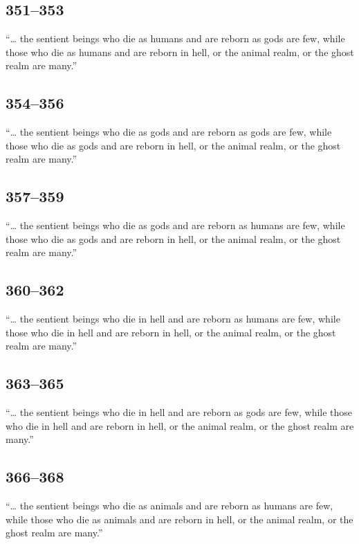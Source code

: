\documentclass[12pt,openany]{book}%
\begin{document}
\subsection*{351–353 }

“… the sentient beings who die as humans and are reborn as gods are few, while those who die as humans and are reborn in hell, or the animal realm, or the ghost realm are many.” 

\subsection*{354–356 }

“… the sentient beings who die as gods and are reborn as gods are few, while those who die as gods and are reborn in hell, or the animal realm, or the ghost realm are many.” 

\subsection*{357–359 }

“… the sentient beings who die as gods and are reborn as humans are few, while those who die as gods and are reborn in hell, or the animal realm, or the ghost realm are many.” 

\subsection*{360–362 }

“… the sentient beings who die in hell and are reborn as humans are few, while those who die in hell and are reborn in hell, or the animal realm, or the ghost realm are many.” 

\subsection*{363–365 }

“… the sentient beings who die in hell and are reborn as gods are few, while those who die in hell and are reborn in hell, or the animal realm, or the ghost realm are many.” 

\subsection*{366–368 }

“… the sentient beings who die as animals and are reborn as humans are few, while those who die as animals and are reborn in hell, or the animal realm, or the ghost realm are many.” 
\end{document}

